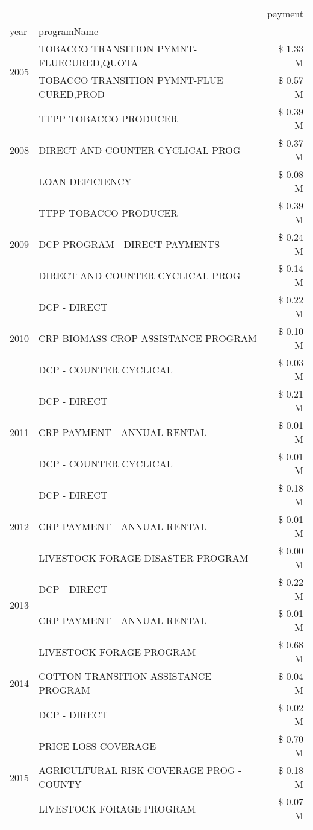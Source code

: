 \begin{tabular}{llr}
\toprule
 &  & payment \\
year & programName &  \\
\midrule
\multirow[t]{2}{*}{2005} & TOBACCO TRANSITION PYMNT-FLUECURED,QUOTA & \$ 1.33 M \\
 & TOBACCO TRANSITION PYMNT-FLUE CURED,PROD & \$ 0.57 M \\
\cline{1-3}
\multirow[t]{3}{*}{2008} & TTPP TOBACCO PRODUCER & \$ 0.39 M \\
 & DIRECT AND COUNTER CYCLICAL PROG & \$ 0.37 M \\
 & LOAN DEFICIENCY & \$ 0.08 M \\
\cline{1-3}
\multirow[t]{3}{*}{2009} & TTPP TOBACCO PRODUCER & \$ 0.39 M \\
 & DCP PROGRAM - DIRECT PAYMENTS & \$ 0.24 M \\
 & DIRECT AND COUNTER CYCLICAL PROG & \$ 0.14 M \\
\cline{1-3}
\multirow[t]{3}{*}{2010} & DCP - DIRECT & \$ 0.22 M \\
 & CRP BIOMASS CROP ASSISTANCE PROGRAM & \$ 0.10 M \\
 & DCP - COUNTER CYCLICAL & \$ 0.03 M \\
\cline{1-3}
\multirow[t]{3}{*}{2011} & DCP - DIRECT & \$ 0.21 M \\
 & CRP PAYMENT - ANNUAL RENTAL & \$ 0.01 M \\
 & DCP - COUNTER CYCLICAL & \$ 0.01 M \\
\cline{1-3}
\multirow[t]{3}{*}{2012} & DCP - DIRECT & \$ 0.18 M \\
 & CRP PAYMENT - ANNUAL RENTAL & \$ 0.01 M \\
 & LIVESTOCK FORAGE DISASTER PROGRAM & \$ 0.00 M \\
\cline{1-3}
\multirow[t]{2}{*}{2013} & DCP - DIRECT & \$ 0.22 M \\
 & CRP PAYMENT - ANNUAL RENTAL & \$ 0.01 M \\
\cline{1-3}
\multirow[t]{3}{*}{2014} & LIVESTOCK FORAGE PROGRAM & \$ 0.68 M \\
 & COTTON TRANSITION ASSISTANCE PROGRAM & \$ 0.04 M \\
 & DCP - DIRECT & \$ 0.02 M \\
\cline{1-3}
\multirow[t]{3}{*}{2015} & PRICE LOSS COVERAGE & \$ 0.70 M \\
 & AGRICULTURAL RISK COVERAGE PROG - COUNTY & \$ 0.18 M \\
 & LIVESTOCK FORAGE PROGRAM & \$ 0.07 M \\

\end{tabular}
